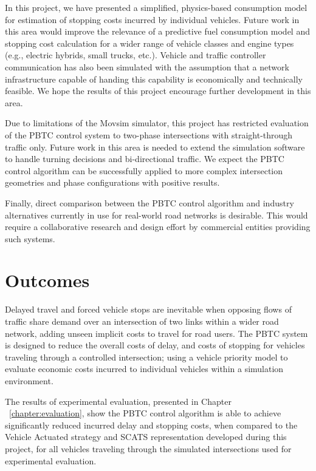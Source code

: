 In this project, we have presented a simplified, physics-based consumption model for estimation of stopping costs incurred by individual vehicles. Future work in this area would improve the relevance of a predictive fuel consumption model and stopping cost calculation for a wider range of vehicle classes and engine types (e.g., electric hybrids, small trucks, etc.). Vehicle and traffic controller communication has also been simulated with the assumption that a network infrastructure capable of handing this capability is economically and technically feasible. We hope the results of this project encourage further development in this area.

Due to limitations of the Movsim simulator, this project has restricted evaluation of the PBTC control system to two-phase intersections with straight-through traffic only. Future work in this area is needed to extend the simulation software to handle turning decisions and bi-directional traffic. We expect the PBTC control algorithm can be successfully applied to more complex intersection geometries and phase configurations with positive results.

Finally, direct comparison between the PBTC control algorithm and industry alternatives currently in use for real-world road networks is desirable. This would require a collaborative research and design effort by commercial entities providing such systems.

\section{Outcomes}

Delayed travel and forced vehicle stops are inevitable when opposing flows of traffic share demand over an intersection of two links within a wider road network, adding unseen implicit costs to travel for road users. The PBTC system is designed to reduce the overall costs of delay, and costs of stopping for vehicles traveling through a controlled intersection; using a vehicle priority model to evaluate economic costs incurred to individual vehicles within a simulation environment.

The results of experimental evaluation, presented in Chapter ~\ref{chapter:evaluation}, show the PBTC control algorithm is able to achieve significantly reduced incurred delay and stopping costs, when compared to the Vehicle Actuated strategy and SCATS representation developed during this project, for all vehicles traveling through the simulated intersections used for experimental evaluation.

